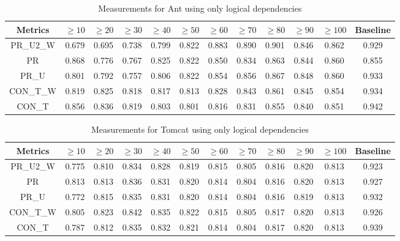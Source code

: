 \documentclass[runningheads]{comsis2}
\begin{document}
\begin{table}[!h]
\setlength\tabcolsep{3.5pt}
\caption{Measurements for Ant using only logical dependencies}
\label{tab:measurementshistory:ant}
\centering
\begin{tabular}{|c|cccccccccc|c|}
\hline
Metrics &	$\geq10$	&	$\geq20$		&	$\geq30$		&	$\geq40$		&	$\geq50$		&	$\geq60$		&	$\geq70$		&	$\geq80$		&	$\geq90$		&	$\geq100$		&	Baseline \\
\hline

PR\_U2\_W	&	0.679	&	0.695	&	0.738	&	0.799	&	0.822	&	0.883	&	0.890	&	0.901	&	0.846	&	0.862	&	0.929	\\
PR	&	0.868	&	0.776	&	0.767	&	0.825	&	0.822	&	0.850	&	0.834	&	0.863	&	0.844	&	0.860	&	0.855	\\
PR\_U	&	0.801	&	0.792	&	0.757	&	0.806	&	0.822	&	0.854	&	0.856	&	0.867	&	0.848	&	0.860	&	0.933	\\
CON\_T\_W	&	0.819	&	0.825	&	0.818	&	0.817	&	0.813	&	0.828	&	0.843	&	0.861	&	0.845	&	0.854	&	0.934	\\
CON\_T	&	0.856	&	0.836	&	0.819	&	0.803	&	0.801	&	0.816	&	0.831	&	0.855	&	0.840	&	0.851	&	0.942	\\


\hline
\end{tabular}
\end{table}


\begin{table}[!h]
\setlength\tabcolsep{3.5pt}
\caption{Measurements for Tomcat using only logical dependencies}
\label{tab:measurementshistory:tomcat}
\centering
\begin{tabular}{|c|cccccccccc|c|}
\hline
Metrics &	$\geq10$	&	$\geq20$		&	$\geq30$		&	$\geq40$		&	$\geq50$		&	$\geq60$		&	$\geq70$		&	$\geq80$		&	$\geq90$		&	$\geq100$		&	Baseline \\
\hline

PR\_U2\_W	&	0.775	&	0.810	&	0.834	&	0.828	&	0.819	&	0.815	&	0.805	&	0.816	&	0.820	&	0.813	&	0.923	\\
PR	&	0.813	&	0.813	&	0.836	&	0.831	&	0.820	&	0.814	&	0.804	&	0.816	&	0.820	&	0.813	&	0.927	\\
PR\_U	&	0.772	&	0.815	&	0.835	&	0.831	&	0.820	&	0.814	&	0.804	&	0.816	&	0.819	&	0.813	&	0.932	\\
CON\_T\_W	&	0.805	&	0.823	&	0.842	&	0.835	&	0.822	&	0.815	&	0.805	&	0.817	&	0.820	&	0.813	&	0.926	\\
CON\_T	&	0.787	&	0.812	&	0.835	&	0.832	&	0.821	&	0.814	&	0.804	&	0.817	&	0.820	&	0.813	&	0.939	\\

				
\hline
\end{tabular}

\end{table}
\end{document}
